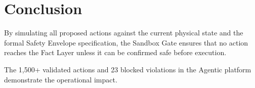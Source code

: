 \documentclass[12pt]{article}
\begin{document}
\section{Conclusion}
\label{sec:conclusion}

By simulating all proposed actions against the current physical state and the formal Safety Envelope specification, the Sandbox Gate ensures that no action reaches the Fact Layer unless it can be confirmed safe before execution.

The 1,500+ validated actions and 23 blocked violations in the Agentic platform demonstrate the operational impact.



\end{document}
